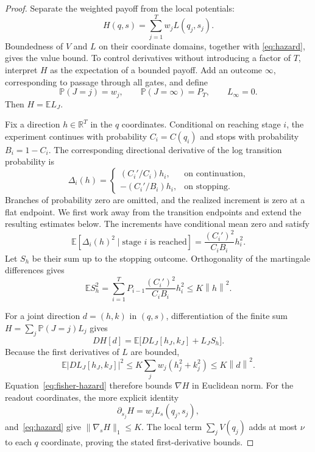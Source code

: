 \documentclass[11pt]{article}
\newcommand{\R}{\mathbb R}
\newcommand{\E}{\mathbb E}
\newcommand{\Pp}{\mathbb P}
\newcommand{\norm}[1]{\left\lVert #1\right\rVert}
\theoremstyle{definition}
\theoremstyle{remark}
\begin{document}
\begin{proof}
Separate the weighted payoff from the local potentials:
\[
 H(q,s)=\sum_{j=1}^Tw_jL(q_j,s_j).
\]
Boundedness of $V$ and $L$ on their coordinate domains, together with
\eqref{eq:hazard}, gives the value bound. To control derivatives without
introducing a factor of $T$, interpret $H$ as the expectation of a bounded
payoff. Add an outcome $\infty$, corresponding to passage through all gates,
and define
\[
 \Pp(J=j)=w_j,
 \qquad
 \Pp(J=\infty)=P_T,
 \qquad L_\infty=0.
\]
Then $H=\E L_J$.

Fix a direction $h\in\R^T$ in the $q$ coordinates. Conditional on reaching
stage $i$, the experiment continues with probability $C_i=C(q_i)$ and stops
with probability $B_i=1-C_i$. The corresponding directional derivative of
the log transition probability is
\[
 \Delta_i(h)=
 \begin{cases}
 (C_i'/C_i)h_i,&\text{on continuation},\\
 -(C_i'/B_i)h_i,&\text{on stopping}.
 \end{cases}
\]
Branches of probability zero are omitted, and the realized increment is
zero at a flat endpoint. We first work away from the transition endpoints
and extend the resulting estimates below. The increments have conditional
mean zero and satisfy
\[
 \E[\Delta_i(h)^2\mid\text{stage $i$ is reached}]
 =\frac{(C_i')^2}{C_iB_i}h_i^2.
\]
Let $S_h$ be their sum up to the stopping outcome. Orthogonality of the
martingale differences gives
\begin{equation}\label{eq:fisher-hazard}
 \E S_h^2
 =\sum_{i=1}^TP_{i-1}
   \frac{(C_i')^2}{C_iB_i}h_i^2
 \le K\norm{h}^2.
\end{equation}

For a joint direction $d=(h,k)$ in $(q,s)$, differentiation of the finite sum
$H=\sum_j\Pp(J=j)L_j$ gives
\begin{equation}\label{eq:latch-first-directional}
 DH[d]=\E\bigl[DL_J[h_J,k_J]+L_JS_h\bigr].
\end{equation}
Because the first derivatives of $L$ are bounded,
\[
 \E|DL_J[h_J,k_J]|^2
 \le K\sum_jw_j(h_j^2+k_j^2)
 \le K\norm{d}^2.
\]
Equation~\eqref{eq:fisher-hazard} therefore bounds $\nabla H$ in Euclidean
norm. For the readout coordinates, the more explicit identity
\[
 \partial_{s_j}H=w_jL_s(q_j,s_j),
\]
and~\eqref{eq:hazard} give
$\|\nabla_sH\|_1\le K$.  The local term $\sum_jV(q_j)$ adds at most $\nu$ to
each $q$ coordinate, proving the stated first-derivative bounds.


\end{proof}
\end{document}
